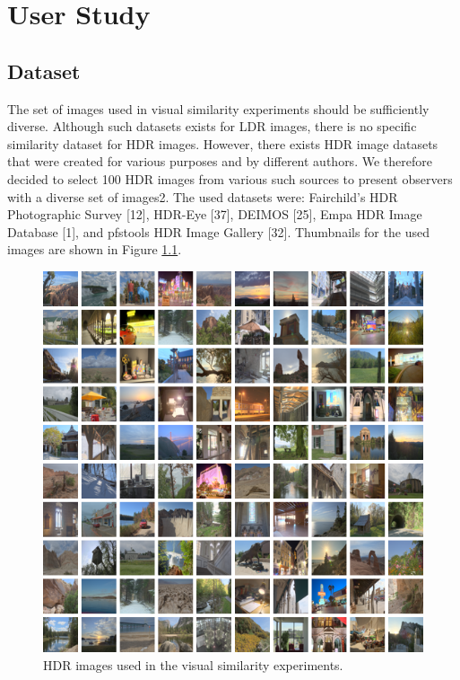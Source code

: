 \chapter{User Study}
\label{chp:b3}

\section{Dataset}
The set of images used in visual similarity experiments should be sufficiently diverse. Although such datasets exists for LDR images, there is no specific similarity dataset for HDR images. However, there exists HDR image datasets that were created for various purposes and by different authors. We therefore decided to select 100 HDR images from various such sources to present observers with a diverse set of images2. The used datasets were: Fairchild’s HDR Photographic Survey [12], HDR-Eye [37], DEIMOS [25], Empa HDR Image Database [1], and pfstools HDR Image Gallery [32]. Thumbnails for the used images are shown in Figure \ref{fig:dataset}.

\begin{figure}
\begin{center}
\includegraphics[width=\textwidth]{figures/chapter3/dataset.png}
\caption{HDR images used in the visual similarity experiments.
}
\label{fig:dataset}
\end{center}
\end{figure}
